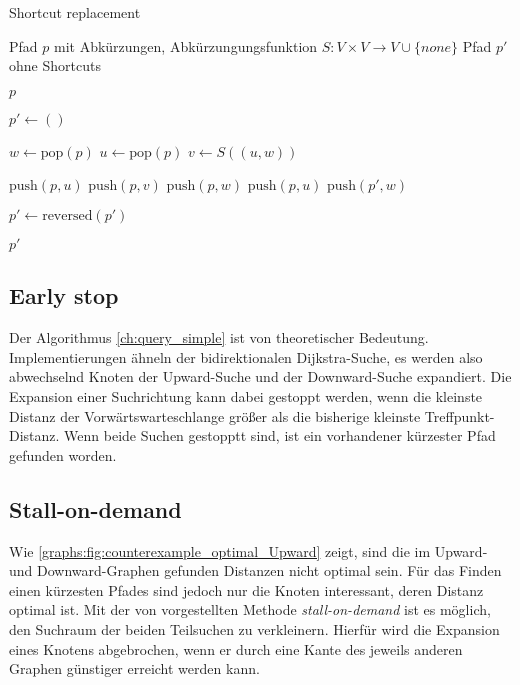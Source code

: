 \begin{algorithm}[ht]
    \caption{Shortcut replacement}
    \begin{algorithmic}[1]
        \Require Pfad $p$ mit Abkürzungen, Abkürzungungsfunktion $S \colon V \times V \to V \cup \{ {none} \}$
        \Ensure Pfad $p'$ ohne Shortcuts

        \State \Return $p$
        \EndIf
        \State

        \State $p' \leftarrow ()$
        \State

        \State $w \leftarrow \text{pop}(p)$
        \State $u \leftarrow \text{pop}(p)$
        \State $v \leftarrow S((u, w))$
        \State

        \State $\text{push}(p, u)$
        \State $\text{push}(p, v)$
        \State $\text{push}(p, w)$
        \Else
        \State $\text{push}(p, u)$
        \State $\text{push}(p', w)$
        \EndIf
        \EndWhile

        \State
        \State $p' \leftarrow \text{reversed}(p')$

        \State
        \State \Return $p'$
    \end{algorithmic}
    \label{ch:alg:shortcut_replacement}
\end{algorithm}

\subsection{Early stop}

Der Algorithmus \ref{ch:query_simple} ist von theoretischer Bedeutung.
Implementierungen ähneln der bidirektionalen Dijkstra-Suche, es werden also abwechselnd Knoten der Upward-Suche und der Downward-Suche expandiert.
Die Expansion einer Suchrichtung kann dabei gestoppt werden, wenn die kleinste Distanz der Vorwärtswarteschlange größer als die bisherige kleinste Treffpunkt-Distanz.
Wenn beide Suchen gestopptt sind, ist ein vorhandener kürzester Pfad gefunden worden.

\subsection{Stall-on-demand}

Wie \autoref{graphs:fig:counterexample_optimal_Upward} zeigt, sind die im Upward- und Downward-Graphen gefunden Distanzen nicht optimal sein.
Für das Finden einen kürzesten Pfades sind jedoch nur die Knoten interessant, deren Distanz optimal ist.
Mit der von \cite{schultes2007dynamic} vorgestellten Methode \emph{stall-on-demand} ist es möglich, den Suchraum der beiden Teilsuchen zu verkleinern.
Hierfür wird die Expansion eines Knotens abgebrochen, wenn er durch eine Kante des jeweils anderen Graphen günstiger erreicht werden kann.

